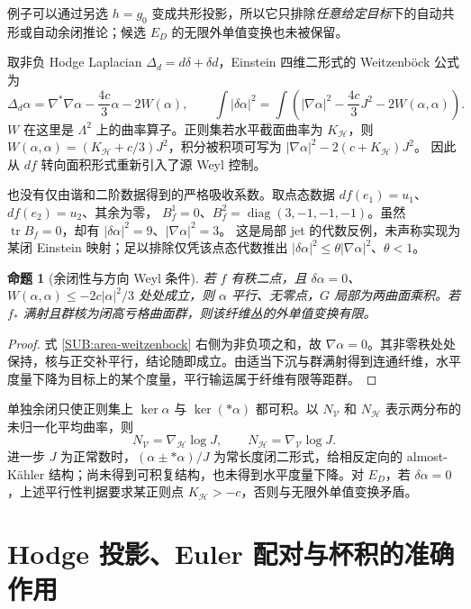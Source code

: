\documentclass[UTF8,fontset=fandol,zihao=-4,oneside,openany]{ctexbook}
\theoremstyle{cjkplain}
\newtheorem{proposition}[theorem]{命题}
\numberwithin{equation}{chapter}
\begin{document}
例子可以通过另选 $h=g_0$ 变成共形投影，所以它只排除\emph{任意给定目标}下的自动共形或自动余闭推论；候选 $E_D$ 的无限外单值变换也未被保留。

取非负 Hodge Laplacian $\Delta_d=d\delta+\delta d$，Einstein 四维二形式的 Weitzenböck 公式为
\begin{equation}\label{SUB:area-weitzenbock}
\Delta_d\alpha=\nabla^*\nabla\alpha-\frac{4c}{3}\alpha-2W(\alpha),
\qquad
\int|\delta\alpha|^2
=\int\left(|\nabla\alpha|^2-\frac{4c}{3}J^2-2W(\alpha,\alpha)\right).
\end{equation}
$W$ 在这里是 $\Lambda^2$ 上的曲率算子。正则集若水平截面曲率为 $K_{\mathcal H}$，则
$W(\alpha,\alpha)=(K_{\mathcal H}+c/3)J^2$，积分被积项可写为
$|\nabla\alpha|^2-2(c+K_{\mathcal H})J^2$。
因此从 $df$ 转向面积形式重新引入了源 Weyl 控制。

也没有仅由谐和二阶数据得到的严格吸收系数。取点态数据
$df(e_1)=u_1$、$df(e_2)=u_2$、其余为零，
$B_f^1=0$、$B_f^2=\operatorname{diag}(3,-1,-1,-1)$。虽然 $\operatorname{tr}B_f=0$，却有
$|\delta\alpha|^2=9$、$|\nabla\alpha|^2=3$。
这是局部 jet 的代数反例，未声称实现为某闭 Einstein 映射；足以排除仅凭该点态代数推出 $|\delta\alpha|^2\le\theta|\nabla\alpha|^2$、$\theta<1$。

\begin{proposition}[余闭性与方向 Weyl 条件]\label{SUB:area-parallel}
若 $f$ 有秩二点，且
$\delta\alpha=0$、$W(\alpha,\alpha)\le-2c|\alpha|^2/3$ 处处成立，则 $\alpha$ 平行、无零点，$G$ 局部为两曲面乘积。若 $f_*$ 满射且群核为闭高亏格曲面群，则该纤维丛的外单值变换有限。
\end{proposition}
\begin{proof}
式 \eqref{SUB:area-weitzenbock} 右侧为非负项之和，故 $\nabla\alpha=0$。其非零秩处处保持，核与正交补平行，结论随即成立。由适当下沉与群满射得到连通纤维，水平度量下降为目标上的某个度量，平行输运属于纤维有限等距群。
\end{proof}

单独余闭只使正则集上 $\ker\alpha$ 与 $\ker(*\alpha)$ 都可积。以 $N_{\mathcal V}$ 和 $N_{\mathcal H}$ 表示两分布的未归一化平均曲率，则
\[
N_{\mathcal V}=\nabla_{\mathcal H}\log J,\qquad
N_{\mathcal H}=\nabla_{\mathcal V}\log J.
\]
进一步 $J$ 为正常数时，$(\alpha\pm*\alpha)/J$ 为常长度闭二形式，给相反定向的 almost-Kähler 结构；尚未得到可积复结构，也未得到水平度量下降。对 $E_D$，若 $\delta\alpha=0$，上述平行性判据要求某正则点 $K_{\mathcal H}>-c$，否则与无限外单值变换矛盾。

\section{Hodge 投影、Euler 配对与杯积的准确作用}
\end{document}
